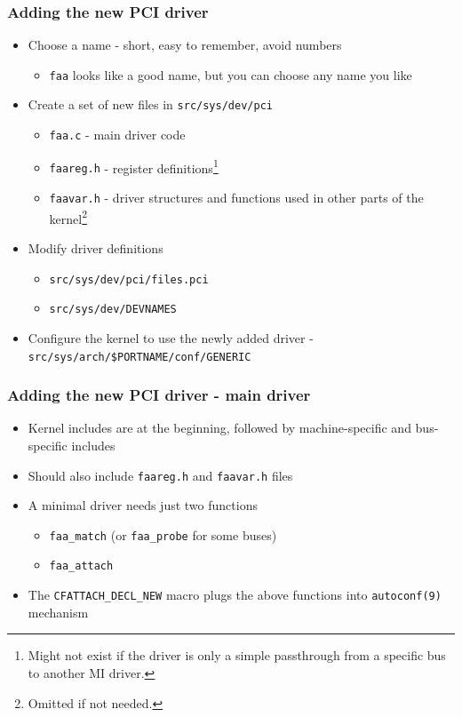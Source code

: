 \documentclass[dvipsnames,table]{beamer}
\begin{document}
\begin{frame}
\frametitle{Adding the new PCI driver}
\begin{itemize}
	\item Choose a name - short, easy to remember, avoid numbers
	\begin{itemize}
		\item {\tt faa} looks like a good name, but you can choose any name you like
	\end{itemize}
	\item Create a set of new files in {\tt src/sys/dev/pci}
	\begin{itemize}
		\item {\tt faa.c} - main driver code
		\item {\tt faareg.h} - register definitions\footnote{Might not exist if the driver is only a simple passthrough from a specific bus to another MI driver.}
		\item {\tt faavar.h} - driver structures and functions used in other parts of the kernel\footnote{Omitted if not needed.}
	\end{itemize}
	\item Modify driver definitions
	\begin{itemize}
		\item {\tt src/sys/dev/pci/files.pci}
		\item {\tt src/sys/dev/DEVNAMES}
	\end{itemize}
	\item Configure the kernel to use the newly added driver - {\tt src/sys/arch/\$PORTNAME/conf/GENERIC}
\end{itemize}
\end{frame}

\begin{frame}
\frametitle{Adding the new PCI driver - main driver}
\begin{itemize}
	\item Kernel includes are at the beginning, followed by machine-specific and bus-specific includes
	\item Should also include {\tt faareg.h} and {\tt faavar.h} files
	\item A minimal driver needs just two functions
	\begin{itemize}
		\item {\tt faa\_match} (or {\tt faa\_probe} for some buses)
		\item {\tt faa\_attach}
	\end{itemize}
	\item The {\tt CFATTACH\_DECL\_NEW} macro plugs the above functions into {\tt autoconf(9)} mechanism
\end{itemize}
\end{frame}
\end{document}
